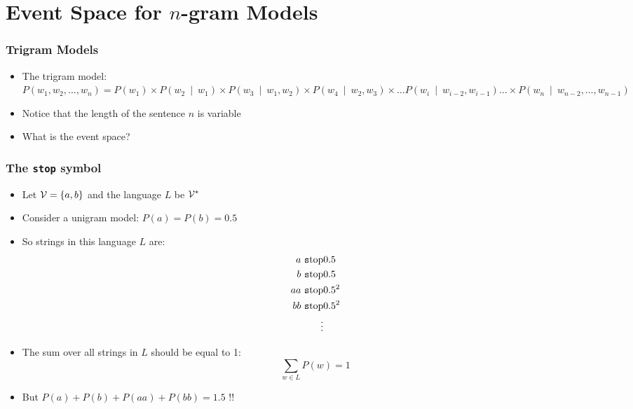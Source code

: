 
\section{Event Space for $n$-gram Models}

\begin{frame}
\frametitle{Trigram Models}
\begin{itemize}[<+->]
\item The trigram model:\\
$P(w_1, w_2, \ldots, w_n) = P(w_1) \times P(w_2~\mid~w_1) \times 
P(w_3~\mid~w_1, w_2) \times P(w_4~\mid~w_2, w_3) 
\times \ldots P(w_i~\mid~w_{i-2}, w_{i-1}) \ldots 
\times P(w_n~\mid~w_{n-2}, \ldots, w_{n-1}) $
\item Notice that the length of the sentence $n$ is variable
\item What is the event space?
\end{itemize}
\end{frame}

\newcommand{\lmstop}{\mbox{\texttt stop}}

\begin{frame}
\frametitle{The {\tt stop} symbol}
\begin{itemize}[<+->]
\item Let ${\cal V} = \{ a, b \}$ and the language $L$ be ${\cal V}^\ast$
\item Consider a unigram model: $P(a) = P(b) = 0.5$
\item So strings in this language $L$ are:
\begin{eqnarray*}
a\ \lmstop & 0.5 \\
b\ \lmstop & 0.5 \\
aa\ \lmstop & 0.5^2 \\
bb\ \lmstop & 0.5^2 \\
\vdots
\end{eqnarray*}
\item The sum over all strings in $L$ should be equal to 1:
\[ \sum_{w \in L} P(w) = 1 \]
\item But $P(a) + P(b) + P(aa) + P(bb) = 1.5$ !! 
\end{itemize}
\end{frame}

